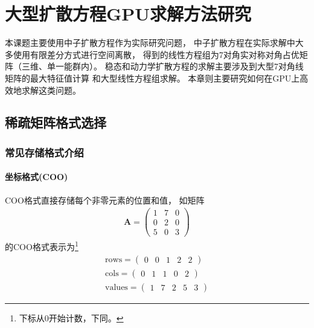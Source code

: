 

\chapter{大型扩散方程GPU求解方法研究}

本课题主要使用中子扩散方程作为实际研究问题，
中子扩散方程在实际求解中大多使用有限差分方式进行空间离散，
得到的线性方程组为7对角实对称对角占优矩阵（三维、单一能群内）。
稳态和动力学扩散方程的求解主要涉及到大型7对角线矩阵的最大特征值计算
和大型线性方程组求解。
本章则主要研究如何在GPU上高效地求解这类问题。

\section{稀疏矩阵格式选择}

\subsection{常见存储格式介绍}

\subsubsection{坐标格式(COO)}
COO格式直接存储每个非零元素的位置和值，
如矩阵
\begin{align*}
\bm{A}=\begin{pmatrix}
1 & 7 & 0\\
0 & 2 & 0\\
5 & 0 & 3
\end{pmatrix}
\end{align*}
的COO格式表示为\footnote{下标从0开始计数，下同。}
\begin{align*}
\mathrm{rows}=\begin{pmatrix}
0 & 0 & 1 & 2 & 2  
\end{pmatrix}
\\
\mathrm{cols}=\begin{pmatrix}
0 & 1 & 1 & 0 & 2
\end{pmatrix}
\\
\mathrm{values}=\begin{pmatrix}
1 & 7 & 2 & 5 & 3
\end{pmatrix}
\end{align*}



